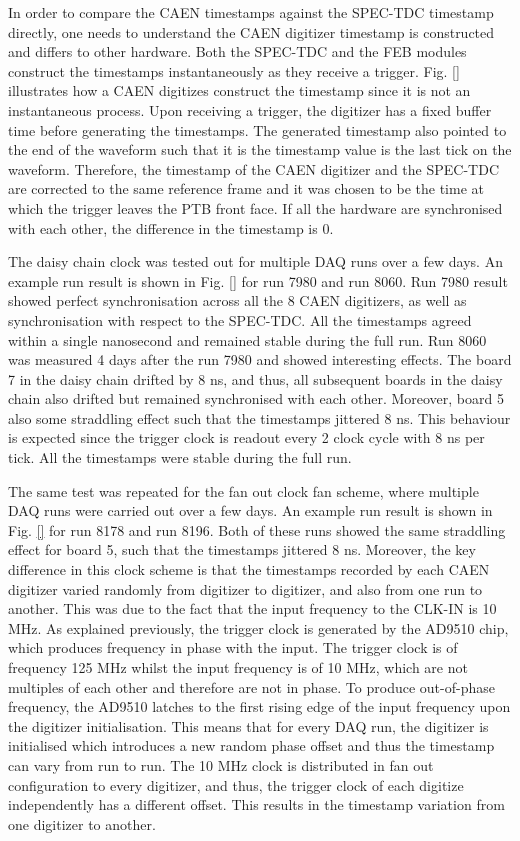 In order to compare the CAEN timestamps against the SPEC-TDC timestamp directly, one needs to understand the CAEN digitizer timestamp is constructed and differs to other hardware.
Both the SPEC-TDC and the FEB modules construct the timestamps instantaneously as they receive a trigger.
Fig. \ref{} illustrates how a CAEN digitizes construct the timestamp since it is not an instantaneous process.
Upon receiving a trigger, the digitizer has a fixed buffer time before generating the timestamps.
The generated timestamp also pointed to the end of the waveform such that it is the timestamp value is the last tick on the waveform.
Therefore, the timestamp of the CAEN digitizer and the SPEC-TDC are corrected to the same reference frame and it was chosen to be the time at which the trigger leaves the PTB front face.
If all the hardware are synchronised with each other, the difference in the timestamp is 0.

The daisy chain clock was tested out for multiple DAQ runs over a few days. 
An example run result is shown in Fig. \ref{} for run 7980 and run 8060.
Run 7980 result showed perfect synchronisation across all the 8 CAEN digitizers, as well as synchronisation with respect to the SPEC-TDC.
All the timestamps agreed within a single nanosecond and remained stable during the full run.
Run 8060 was measured 4 days after the run 7980 and showed interesting effects.
The board 7 in the daisy chain drifted by 8 ns, and thus, all subsequent boards in the daisy chain also drifted but remained synchronised with each other. 
Moreover, board 5 also some straddling effect such that the timestamps jittered 8 ns.
This behaviour is expected since the trigger clock is readout every 2 clock cycle with 8 ns per tick.
All the timestamps were stable during the full run.

The same test was repeated for the fan out clock fan scheme, where multiple DAQ runs were carried out over a few days.
An example run result is shown in Fig. \ref{} for run 8178 and run 8196.
Both of these runs showed the same straddling effect for board 5, such that the timestamps jittered 8 ns.
Moreover, the key difference in this clock scheme is that the timestamps recorded by each CAEN digitizer varied randomly from digitizer to digitizer, and also from one run to another.
This was due to the fact that the input frequency to the CLK-IN is 10 MHz.
As explained previously, the trigger clock is generated by the AD9510 chip, which produces frequency in phase with the input.
The trigger clock is of frequency 125 MHz whilst the input frequency is of 10 MHz, which are not multiples of each other and therefore are not in phase.
To produce out-of-phase frequency, the AD9510 latches to the first rising edge of the input frequency upon the digitizer initialisation. 
This means that for every DAQ run, the digitizer is initialised which introduces a new random phase offset and thus the timestamp can vary from run to run.
The 10 MHz clock is distributed in fan out configuration to every digitizer, and thus, the trigger clock of each digitize independently has a different offset.
This results in the timestamp variation from one digitizer to another.

